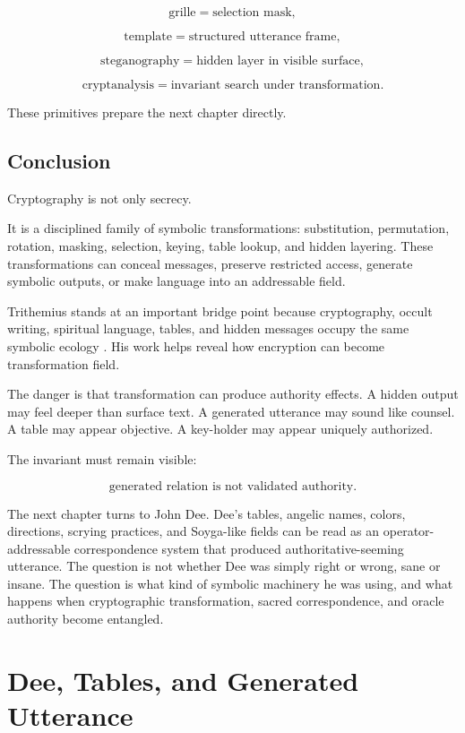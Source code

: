 \documentclass[11pt]{book}
\begin{document}
\[
\text{grille} = \text{selection mask},
\]

\[
\text{template} = \text{structured utterance frame},
\]

\[
\text{steganography} = \text{hidden layer in visible surface},
\]

\[
\text{cryptanalysis} = \text{invariant search under transformation}.
\]

These primitives prepare the next chapter directly.

\section{Conclusion}

Cryptography is not only secrecy.

It is a disciplined family of symbolic transformations: substitution, permutation, rotation, masking, selection, keying, table lookup, and hidden layering. These transformations can conceal messages, preserve restricted access, generate symbolic outputs, or make language into an addressable field.

Trithemius stands at an important bridge point because cryptography, occult writing, spiritual language, tables, and hidden messages occupy the same symbolic ecology \cite{Trithemius1999Steganographia,Kahn1996Codebreakers,Yates1964GiordanoBruno}. His work helps reveal how encryption can become transformation field.

The danger is that transformation can produce authority effects. A hidden output may feel deeper than surface text. A generated utterance may sound like counsel. A table may appear objective. A key-holder may appear uniquely authorized.

The invariant must remain visible:

\[
\text{generated relation is not validated authority}.
\]

The next chapter turns to John Dee. Dee's tables, angelic names, colors, directions, scrying practices, and Soyga-like fields can be read as an operator-addressable correspondence system that produced authoritative-seeming utterance. The question is not whether Dee was simply right or wrong, sane or insane. The question is what kind of symbolic machinery he was using, and what happens when cryptographic transformation, sacred correspondence, and oracle authority become entangled.

\chapter{Dee, Tables, and Generated Utterance}
\end{document}
